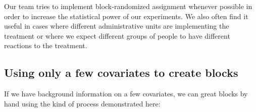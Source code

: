 \documentclass[
  12pt,
]{book}
\newenvironment{Shaded}{\begin{snugshade}}{\end{snugshade}}
\newcommand{\AttributeTok}[1]{\textcolor[rgb]{0.77,0.63,0.00}{#1}}
\newcommand{\DecValTok}[1]{\textcolor[rgb]{0.00,0.00,0.81}{#1}}
\newcommand{\DocumentationTok}[1]{\textcolor[rgb]{0.56,0.35,0.01}{\textbf{\textit{#1}}}}
\newcommand{\FunctionTok}[1]{\textcolor[rgb]{0.00,0.00,0.00}{#1}}
\newcommand{\NormalTok}[1]{#1}
\newcommand{\OtherTok}[1]{\textcolor[rgb]{0.56,0.35,0.01}{#1}}
\newcommand{\SpecialCharTok}[1]{\textcolor[rgb]{0.00,0.00,0.00}{#1}}
\newcommand{\StringTok}[1]{\textcolor[rgb]{0.31,0.60,0.02}{#1}}
\theoremstyle{definition}
\theoremstyle{definition}
\theoremstyle{definition}
\theoremstyle{remark}
\begin{document}
\begin{Shaded}
\end{Shaded}

Our team tries to implement block-randomized assignment whenever
possible in order to increase the statistical power of our experiments.
We also often find it useful in cases where different administrative
units are implementing the treatment or where we expect different groups
of people to have different reactions to the treatment.

\hypertarget{using-only-a-few-covariates-to-create-blocks}{%
\subsection{Using only a few covariates to create
blocks}\label{using-only-a-few-covariates-to-create-blocks}}

If we have background information on a few covariates, we can great
blocks by hand using the kind of process demonstrated here:

\begin{Shaded}
\end{Shaded}
\end{document}

